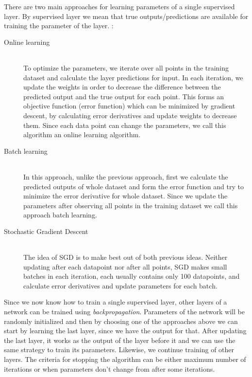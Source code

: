There are two main approaches for learning parameters of a single supervised
layer. By supervised layer we mean that true outputs/predictions are available
for training the parameter of the layer. :
\begin{description}
  \item[Online learning] \hfil \\
    To optimize the parameters, we
    iterate over all points in the training dataset and calculate the layer
    predictions for input. In each iteration, we update the weights in order to
    decrease the difference between the predicted output and the true output for
    each point. This forms an objective function (error function) which can be
    minimized by gradient descent, by calculating error derivatives and update
    weights to decrease them.
    Since each data point can change the parameters, we call this algorithm an online learning algorithm.
  \item[Batch learning] \hfil \\
  In this approach, unlike the previous approach, first we calculate the
  predicted outputs of whole dataset and form the error function and try to
  minimize the error derivative for whole dataset. Since we update the
  parameters after observing all points in the training dataset we call this
  approach batch learning.
  
  \item[Stochastic Gradient Descent] \hfil \\
  The idea of SGD is to make best out of both previous ideas. Neither updating
  after each datapoint nor after all points, SGD makes small batches in each
  iteration, each usually contains only 100 datapoints, and calculate error
  derivatives and update parameters for each batch.
  
  
\end{description} 

Since we now know how to train a single supervised layer, other layers of a
network can be trained using \textit{backpropagation}. Parameters of the network
will be randomly initialized and then by choosing one of the approaches above we
can start by learning the last layer, since we have the output for that. After
updating the last layer, it works as the output of the layer before it and we
can use the same strategy to train its parameters. Likewise, we continue
training of other layers. The criteria for stopping the algorithm can be either
maximum number of iterations or when parameters don't change from after some
iterations.

